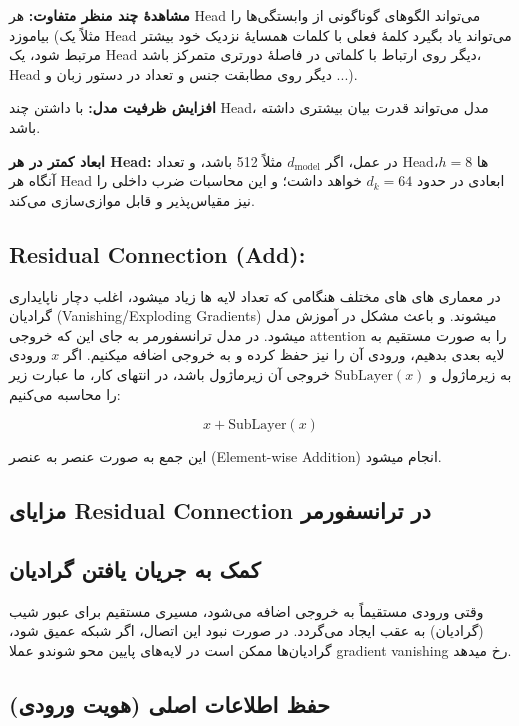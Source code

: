 \textbf{مشاهدهٔ چند منظر متفاوت:} هر Head می‌تواند الگوهای گوناگونی از وابستگی‌ها را بیاموزد (مثلاً یک Head می‌تواند یاد بگیرد کلمهٔ فعلی با کلمات همسایهٔ نزدیک خود بیشتر مرتبط شود، یک Head دیگر روی ارتباط با کلماتی در فاصلهٔ دورتری متمرکز باشد، Head دیگر روی مطابقت جنس و تعداد در دستور زبان و ...).

\textbf{افزایش ظرفیت مدل:} با داشتن چند Head، مدل می‌تواند قدرت بیان بیشتری داشته باشد.

\textbf{ابعاد کمتر در هر Head:} در عمل، اگر \( d_{\text{model}} \) مثلاً 512 باشد، و تعداد Headها \( h = 8 \)، آنگاه هر Head ابعادی در حدود \( d_k = 64 \) خواهد داشت؛ و این محاسبات ضرب داخلی را نیز مقیاس‌پذیر و قابل موازی‌سازی می‌کند.


\subsection{Residual Connection (Add):}
در معماری های های مختلف هنگامی که تعداد لایه ها زیاد  میشود، اغلب دچار ناپایداری گرادیان (Vanishing/Exploding Gradients) میشوند. و باعث مشکل در آموزش مدل میشود.
در مدل ترانسفورمر به جای این که خروجی attention  را به صورت مستقیم به لایه بعدی بدهیم، ورودی آن را نیز حفظ کرده و به خروجی اضافه میکنیم.
اگر \( x \) ورودی به زیرماژول و \( \text{SubLayer}(x) \) خروجی آن زیرماژول باشد، در انتهای کار، ما عبارت زیر را محاسبه می‌کنیم:


\[
x + \text{SubLayer}(x)
\]

این جمع به صورت عنصر به عنصر (Element-wise Addition)  انجام میشود.


\subsection{مزایای Residual Connection در ترانسفورمر}

\subsection*{کمک به جریان یافتن گرادیان}

وقتی ورودی مستقیماً به خروجی اضافه می‌شود، مسیری مستقیم برای عبور شیب (گرادیان) به عقب ایجاد می‌گردد.
در صورت نبود این اتصال، اگر شبکه عمیق شود، گرادیان‌ها ممکن است در لایه‌های پایین محو شوندو عملا gradient vanishing رخ میدهد.

\subsection*{حفظ اطلاعات اصلی (هویت ورودی)}

